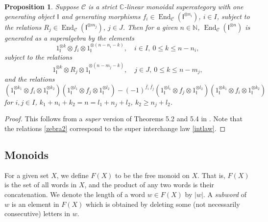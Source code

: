 \documentclass[11pt]{amsart}
\newcommand\go{\mathsf{I}}              %
\newtheorem{prop}[theo]{Proposition}
\theoremstyle{definition}
\numberwithin{equation}{section}
\begin{document}
\begin{prop} \label{zebra}
Suppose $ \mathcal{C} $ is a strict $ \mathbb{C} $-linear monoidal supercategory with one generating object $\go$ and generating morphisms $f_i \in \operatorname{End}_{\mathcal{C}}(\go^{\otimes n_{i}}) $, $i \in I$, subject to the relations $R_j \in \operatorname{End}_{\mathcal{C}}(\go^{\otimes m_{j}})$, $j \in J$.  Then for a given $ n \in \mathbb{N} $, $\operatorname{End}_{\mathcal{C}}(\go^{\otimes n})$ is generated as a superalgebra by the elements
\begin{equation}
 1_{\go}^{\otimes k} \otimes f_{i} \otimes 1_{\go}^{\otimes (n-n_{i}-k)},\quad i \in I,\ 0 \leq k \leq n-n_{i},
\end{equation}
    subject to the relations
    \begin{equation} \label{zebra1}
        1_{\go}^{\otimes k} \otimes R_j \otimes 1_{\go}^{\otimes(n-m_{j}-k)},\quad j \in J,\ 0 \leq k \leq n-m_j,
    \end{equation}
    and the relations
    \begin{equation} \label{zebra2}
        \left( 1_{\go}^{\otimes k_{1}} \otimes f_i \otimes 1_{\go}^{\otimes k_2} \right)
        \left( 1_{\go}^{\otimes l_{1}} \otimes f_j \otimes 1_{\go}^{\otimes l_2} \right)
        - (-1)^{\overline{f_i} \ \overline{f_j}}
        \left( 1_{\go}^{\otimes l_{1}} \otimes f_j \otimes 1_{\go}^{\otimes l_2} \right)
        \left( 1_{\go}^{\otimes k_{1}} \otimes f_i \otimes 1_{\go}^{\otimes k_2} \right)
    \end{equation}
    for $i,j \in I$, $k_1+n_i+k_2 = n = l_1 + n_j + l_2$, $k_2 \geq n_j + l_2$.
\end{prop}

\begin{proof}
This follows from a \emph{super} version of Theorems 5.2 and 5.4 in \cite{Liu}. Note that the relations \cref{zebra2} correspond to the super interchange law \cref{intlaw}.
\end{proof}







\subsection{Monoids}

For a given set \(X\), we define $ F(X) $ to be the free monoid on \(X\). That is, $ F(X) $ is the set of all words in \(X\), and the product of any two words is their concatenation. We denote the length of a word $ w \in F(X) $ by $ |w| $. A \emph{subword} of $ w $ is an element in $ F(X) $ which is obtained by deleting some (not necessarily consecutive) letters in \(w\).
\end{document}
